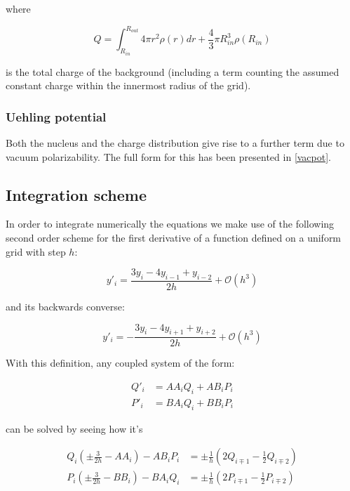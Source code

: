 \documentclass[]{report}
\begin{document}
where 

\begin{equation}
Q = \int_{R_{in}}^{R_{out}} 4\pi r^2\rho(r) dr + \frac{4}{3}\pi R_{in}^3\rho(R_{in})
\end{equation}

is the total charge of the background (including a term counting the assumed constant charge within the innermost radius of the grid).

\subsubsection{Uehling potential}

Both the nucleus and the charge distribution give rise to a further term due to vacuum polarizability. The full form for this has been presented in \ref{vacpot}.

\subsection{Integration scheme}

In order to integrate numerically the equations we make use of the following second order scheme for the first derivative of a function defined on a uniform grid with step $h$:

\begin{equation}
y'_i = \frac{3y_i-4y_{i-1}+y_{i-2}}{2h} + \mathcal{O}(h^3)
\end{equation}

and its backwards converse:

\begin{equation}
y'_i = -\frac{3y_i-4y_{i+1}+y_{i+2}}{2h} + \mathcal{O}(h^3)
\end{equation}

With this definition, any coupled system of the form:

\begin{align}
Q'_i &= AA_i Q_i + AB_iP_i \\
P'_i &= BA_i Q_i + BB_iP_i
\end{align}

can be solved by seeing how it's

\begin{align}
Q_i\left(\pm\frac{3}{2h}-AA_i\right) - AB_iP_i&= \pm\frac{1}{h}\left(2Q_{i\mp1}-\frac{1}{2}Q_{i\mp2}\right) \\
P_i\left(\pm\frac{3}{2h}-BB_i\right) - BA_iQ_i&= \pm\frac{1}{h}\left(2P_{i\mp1}-\frac{1}{2}P_{i\mp2}\right)
\end{align}
\end{document}
